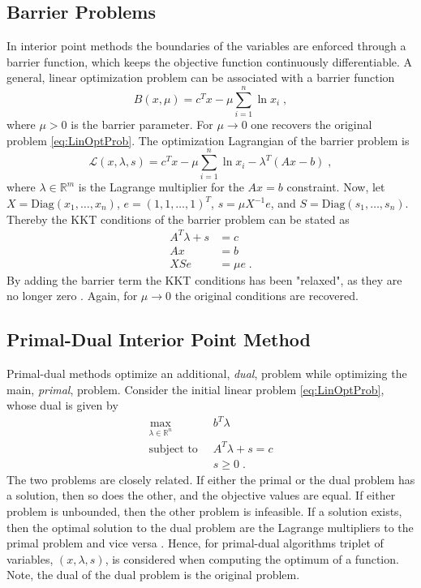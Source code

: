 \subsection{Barrier Problems}
In interior point methods the boundaries of the variables are enforced through a barrier function, which keeps the objective function continuously differentiable.
A general, linear optimization problem can be associated with a barrier function
\begin{equation}
	B(x , \mu) = c^T x - \mu \sum_{i=1}^{n} \ln x_i \; ,
\end{equation} 
where $\mu > 0$ is the barrier parameter. For $\mu \to 0$ one recovers the original problem \eqref{eq:LinOptProb}.
The optimization Lagrangian of the barrier problem is
\begin{equation}
	\mathcal{L}(x, \lambda, s) = c^T x - \mu \sum_{i=1}^{n} \ln x_i - \lambda^T (A x -b) \; ,
\end{equation}
where $\lambda \in \mathbb{R}^m$ is the Lagrange multiplier for the $A x = b$ constraint. Now, let $X = \mathrm{Diag}(x_1 , \ldots , x_n)$, $e = (1,1, \ldots , 1)^T$, $s = \mu X^{-1} e$, and $S = \mathrm{Diag}(s_1 , \ldots , s_n)$. Thereby the KKT conditions of the barrier problem can be stated as 
\begin{subequations}
\begin{align}
	A^T \lambda + s &= c \\
	A x &= b \\
	X S e &= \mu e \; .
\end{align}
\end{subequations}
By adding the barrier term the KKT conditions has been "relaxed", as they are no longer zero \cite{ipnote}. Again, for $\mu \to 0$ the original conditions are recovered. 


\subsection{Primal-Dual Interior Point Method}
Primal-dual methods optimize an additional, \textit{dual}, problem while optimizing the main, \textit{primal}, problem.
Consider the initial linear problem \eqref{eq:LinOptProb}, whose dual is given by 
\begin{align*}
	\max_{\lambda \in \mathbb{R}^n} \;  & \; b^T \lambda \\
	\text{subject to} \;  & \; A^T \lambda + s = c  \\
							& \; s \geq 0 \; .
\end{align*}
The two problems are closely related. If either the primal or the dual problem has a solution, then so does the other, and the objective values are equal. If either problem is unbounded, then the other problem is infeasible. If a solution exists, then the optimal solution to the dual problem are the Lagrange multipliers to the primal problem and vice versa \cite{wright}.
Hence, for primal-dual algorithms triplet of variables, $(x , \lambda , s)$, is considered when computing the optimum of a function. Note, the dual of the dual problem is the original problem.\\

